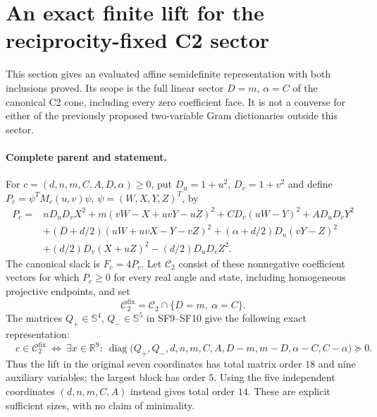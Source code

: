 \section{An exact finite lift for the reciprocity-fixed C2 sector}
\label{sec:c2-reciprocal-fixed-sector}

This section gives an evaluated affine semidefinite representation with
both inclusions proved.  Its scope is the full linear sector
$D=m$, $\alpha=C$ of the canonical C2 cone, including every zero
coefficient face.  It is not a converse for either of the previously
proposed two-variable Gram dictionaries outside this sector.

\paragraph{Complete parent and statement.}
For $c=(d,n,m,C,A,D,\alpha)\geq0$, put $D_u=1+u^2$, $D_v=1+v^2$ and
define $P_c=\psi^TM_c(u,v)\psi$, $\psi=(W,X,Y,Z)^T$, by
\begin{align*}
P_c={}&nD_uD_vX^2+m(vW-X+uvY-uZ)^2
 +CD_v(uW-Y)^2+AD_uD_vY^2\\
&+(D+d/2)(uW+uvX-Y-vZ)^2
 +(\alpha+d/2)D_u(vY-Z)^2\\
&+(d/2)D_v(X+uZ)^2-(d/2)D_uD_vZ^2.
\end{align*}
The canonical slack is $F_c=4P_c$.  Let $\mathcal C_2$ consist of these
nonnegative coefficient vectors for which $P_c\geq0$ for every real
angle and state, including homogeneous projective endpoints, and set
\[
\mathcal C_2^{\mathrm{fix}}
 =\mathcal C_2\cap\{D=m,\ \alpha=C\}.
\tag{SF1}
\]
The matrices $Q_+\in\mathbb S^4$, $Q_-\in\mathbb S^5$ in SF9--SF10
give the following exact representation:
\[
\boxed{\quad
c\in\mathcal C_2^{\mathrm{fix}}
\ \Longleftrightarrow\ 
\exists x\in\mathbb R^9:\
\operatorname{diag}\bigl(Q_+,Q_-,d,n,m,C,A,
 D-m,m-D,\alpha-C,C-\alpha\bigr)\succeq0.
\quad}
\tag{SF2}
\]
Thus the lift in the original seven coordinates has total matrix order
$18$ and nine auxiliary variables; the largest block has order $5$.
Using the five independent coordinates $(d,n,m,C,A)$ instead gives
total order $14$.  These are explicit sufficient sizes, with no claim
of minimality.


